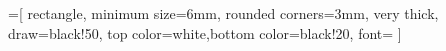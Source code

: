 =[
  rectangle,
  minimum size=6mm, rounded corners=3mm,
  very thick,
  draw=black!50,
  top color=white,bottom color=black!20,
  font=\ttfamily
]

